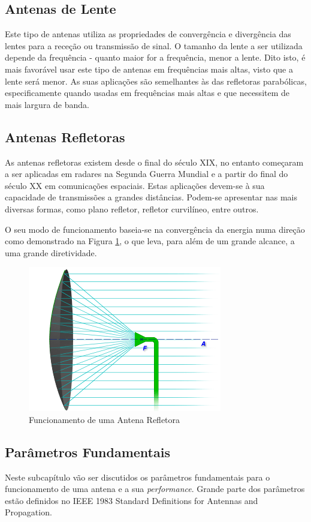 \subsection*{Antenas de Lente}
Este tipo de antenas utiliza as propriedades de convergência e divergência das lentes para a receção ou transmissão de sinal. O tamanho da lente a ser utilizada depende da frequência - quanto maior for a frequência, menor a lente. Dito isto, é mais favorável usar este tipo de antenas em frequências mais altas, visto que a lente será menor. As suas aplicações são semelhantes às das refletoras parabólicas, especificamente quando usadas em frequências mais altas e que necessitem de mais largura de banda.

\subsection*{Antenas Refletoras}
As antenas refletoras existem desde o final do século XIX, no entanto começaram a ser aplicadas em radares na Segunda Guerra Mundial e a partir do final do século XX em comunicações espaciais. Estas aplicações devem-se à sua capacidade de transmissões a grandes distâncias. Podem-se apresentar nas mais diversas formas, como plano refletor, refletor curvilíneo, entre outros.\par 
O seu modo de funcionamento baseia-se na convergência da energia numa direção como demonstrado na Figura \ref{fig:reflector}, o que leva, para além de um grande alcance, a uma grande diretividade.

\begin{figure}[h]
\centering
\includegraphics[scale=0.6]{chapters/ch3/assets/reflector}
\decoRule
\caption[Antena Refletora]{Funcionamento de uma Antena Refletora}
\label{fig:reflector}
\end{figure}

\subsection{Parâmetros Fundamentais}
Neste subcapítulo vão ser discutidos os parâmetros fundamentais para o funcionamento de uma antena e a sua \textit{performance}. Grande parte dos parâmetros estão definidos no IEEE 1983 Standard Definitions for Antennas and Propagation.

